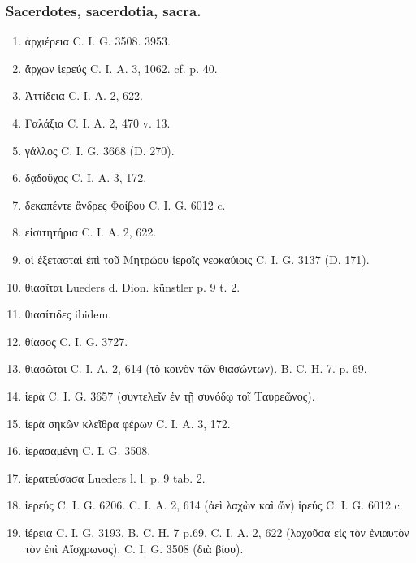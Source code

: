 \documentclass[a4paper, 11pt, oneside, polutonikogreek, german, twocolumn]{article}
\begin{document}
\subsubsection{Sacerdotes, sacerdotia, sacra.}
\begin{enumerate}
\item ἀρχιέρεια C. I. G. 3508. 3953.

\item ἄρχων ἱερεύς C. I. A. 3, 1062. cf. p. 40.

\item Ἀττίδεια C. I. A. 2, 622.

\item Γαλάξια C. I. A. 2, 470 v. 13.

\item γάλλος C. I. G. 3668 (D. 270).

\item δᾳδοῦχος C. I. A. 3, 172.

\item δεκαπέντε ἄνδρες Φοίβου C. I. G. 6012 c.

\item εἰσιτητήρια C. I. A. 2, 622.

\item οἱ ἐξετασταὶ ἐπὶ τοῦ Μητρώου ἱεροῖς νεοκαύιοις C. I. G. 3137 (D. 171).

\item θιασῖται Lueders d. Dion. künstler p. 9 t. 2.

\item θιασίτιδες ibidem.

\item θίασος C. I. G. 3727.

\item θιασῶται C. I. A. 2, 614 (τὸ κοινὸν τῶν θιασώντων). B. C. H. 7. p. 69.

\item ἱερὰ C. I. G. 3657 (συντελεῖν ἐν τῇ συνόδῳ τοῖ Ταυρεῶνος).

\item ἱερὰ σηκῶν κλεῖθρα φέρων C. I. A. 3, 172.

\item ἱερασαμένη C. I. G. 3508.

\item ἱερατεύσασα Lueders l. l. p. 9 tab. 2.

\item ἱερεύς C. I. G. 6206. C. I. A. 2, 614 (ἀεὶ λαχὼν καὶ ὤν) ἱρεύς C. I. G. 6012 c.

\item ἱέρεια C. I. G. 3193. B. C. H. 7 p.69. C. I. A. 2, 622 (λαχοῦσα εἰς τὸν ἐνιαυτὸν τὸν ἐπὶ Αἴσχρωνος). C. I. G. 3508 (διὰ βίου).


\end{enumerate}
\end{document}
